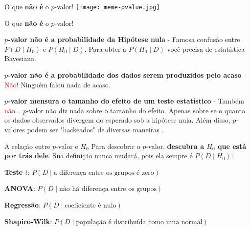 \begin{frame}{O que \textbf{não é} o $p$-valor!}
	\centering
	\texttt{[image: meme-pvalue.jpg]}
\end{frame}

\begin{frame}{O que \textbf{não é} o $p$-valor!}
	\begin{vfilleditems}
		\item \textbf{$p$-valor não é a probabilidade da Hipótese nula}
		- Famosa confusão entre $P(D \mid H_0)$ e $P(H_0 \mid D)$.
		Para obter a $P(H_0 \mid D)$ você precisa de estatística Bayesiana.
		\item \textbf{$p$-valor não é a probabilidade dos dados serem produzidos pelo acaso}
		- \textcolor{red}{Não!} Ninguém falou nada de acaso.
		\item \textbf{$p$-valor mensura o tamanho do efeito de um teste estatístico}
		- Também \textcolor{red}{não}... $p$-valor não diz nada sobre o tamanho do efeito.
		Apenas sobre se o quanto os dados observados divergem do esperado sob a hipótese nula.
		Além disso, $p$-valores podem ser "hackeados" de diversas maneiras \parencite{head2015extent}.
	\end{vfilleditems}
\end{frame}

\begin{frame}{A relação entre $p$-valor e $H_0$}
	Para descobrir o $p$-valor, \textbf{descubra a $H_0$ que está por trás dele}.
	Sua definição nunca mudará, pois ela sempre é $P(D \mid H_0)$:
	\begin{vfilleditems}
		\item \textbf{Teste $t$}: $P(D \mid \text{a diferença entre os grupos é zero})$
		\item \textbf{ANOVA}: $P(D \mid \text{não há diferença entre os grupos})$
		\item \textbf{Regressão}: $P(D \mid \text{coeficiente é nulo})$
		\item \textbf{Shapiro-Wilk}: $P(D \mid \text{população é distribuída como uma normal})$
	\end{vfilleditems}
\end{frame}


